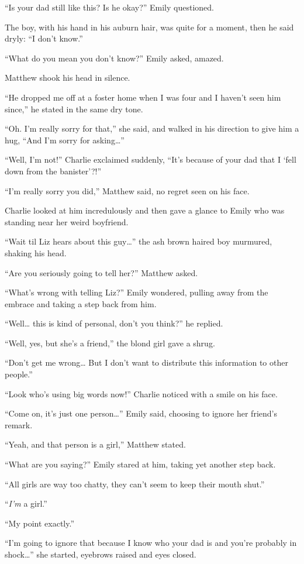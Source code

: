 “Is your dad still like this? Is he okay?” Emily questioned.

The boy, with his hand in his auburn hair, was quite for a moment, then he said dryly: “I don’t know.”

“What do you mean you don’t know?” Emily asked, amazed.

Matthew shook his head in silence.

“He dropped me off at a foster home when I was four and I haven’t seen him since,” he stated in the same dry tone.

“Oh. I’m really sorry for that,” she said, and walked in his direction to give him a hug, “And I’m sorry for asking…”

“Well, I’m not!” Charlie exclaimed suddenly, “It’s because of your dad that I ‘fell down from the banister’?!”

“I’m really sorry you did,” Matthew said, no regret seen on his face.

Charlie looked at him incredulously and then gave a glance to Emily who was standing near her weird boyfriend.

“Wait til Liz hears about this guy…” the ash brown haired boy murmured, shaking his head.

“Are you seriously going to tell her?” Matthew asked.

“What’s wrong with telling Liz?” Emily wondered, pulling away from the embrace and taking a step back from him.

“Well… this is kind of personal, don’t you think?” he replied.

“Well, yes, but she’s a friend,” the blond girl gave a shrug.

“Don’t get me wrong… But I don’t want to distribute this information to other people.”

“Look who’s using big words now!” Charlie noticed with a smile on his face.

“Come on, it’s just one person…” Emily said, choosing to ignore her friend’s remark.

“Yeah, and that person is a girl,” Matthew stated.

“What are you saying?” Emily stared at him, taking yet another step back.

“All girls are way too chatty, they can’t seem to keep their mouth shut.”

“\textit{I’m} a girl.”

“My point exactly.”

“I’m going to ignore that because I know who your dad is and you’re probably in shock…” she started, eyebrows raised and eyes closed.

